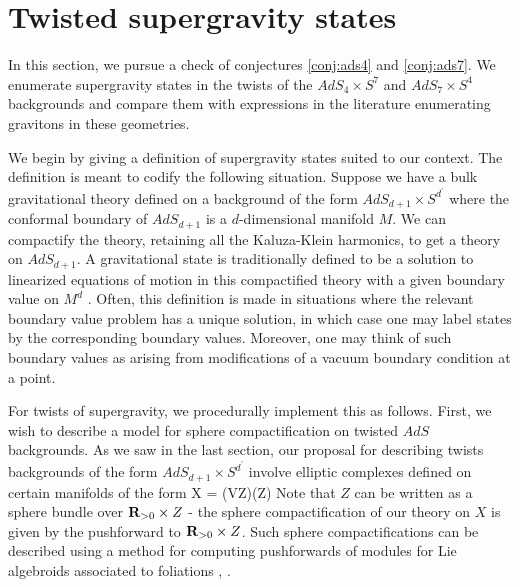 \documentclass[../main.tex]{subfiles}
\begin{document}
\section{Twisted supergravity states}
\label{sec:states}


In this section, we pursue a check of conjectures \ref{conj:ads4} and \ref{conj:ads7}. We enumerate supergravity states in the twists of the $AdS_4\times S^7$ and $AdS_7\times S^4$ backgrounds and compare them with expressions in the literature enumerating gravitons in these geometries. 

We begin by giving a definition of supergravity states suited to our context. 
The definition is meant to codify the following situation. 
Suppose we have a bulk gravitational theory defined on a background of the form $AdS_{d+1} \times S^{d^\prime}$ where the conformal boundary of $AdS_{d+1}$ is a $d$-dimensional manifold $M$. 
We can compactify the theory, retaining all the Kaluza-Klein harmonics, to get a theory on $AdS_{d+1}$. 
A gravitational state is traditionally defined to be a solution to linearized equations of motion in this compactified theory with a given boundary value on $M^{d}$ \cite{WittenAdS}. Often, this definition is made in situations where the relevant boundary value problem has a unique solution, in which case one may label states by the corresponding boundary values. Moreover, one may think of such boundary values as arising from modifications of a vacuum boundary condition at a point.

For twists of supergravity, we procedurally implement this as follows. First, we wish to describe a model for sphere compactification on twisted $AdS$ backgrounds. 
As we saw in the last section, our proposal for describing twists backgrounds of the form $AdS_{d+1}\times S^{d^\prime}$ involve elliptic complexes defined on certain manifolds of the form 
\beqn
X = (V\to Z)(Z)
\eeqn
Note that $Z$ can be written as a sphere bundle over $\mathbf{R}_{>0}\times Z$ - the sphere compactification of our theory on $X$ is given by the pushforward to $\mathbf{R}_{>0}\times Z$. 
Such sphere compactifications can be described using a method for computing pushforwards of modules for Lie algebroids associated to foliations \cite[section 4.2]{KormanThesis}, \cite{KamberTondeur}.
\end{document}
